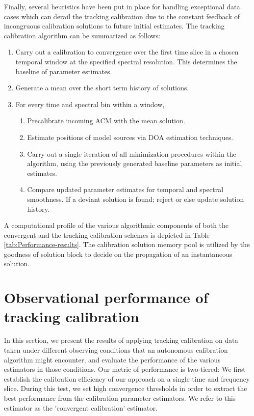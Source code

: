 \documentclass{aa}
\begin{document}
Finally, several heuristics have been put in place for handling exceptional data
cases which can derail the tracking  calibration due to the constant feedback of
incongruous  calibration solutions  to future  initial estimates.   The tracking
calibration algorithm can be summarized as follows:
\begin{enumerate}
\item Carry  out a  calibration to convergence  over the  first time slice  in a
  chosen temporal  window at the specified spectral  resolution. This determines
  the baseline of parameter estimates.
\item Generate a mean over the short term history of solutions.
\item For every time and spectral bin within a window,
  \begin{enumerate}
    \item Precalibrate incoming ACM with the mean solution.
    \item Estimate positions of model sources via DOA estimation techniques.
    \item Carry out a single iteration of all minimization procedures within the
      algorithm, using  the previously generated baseline  parameters as initial
      estimates.
    \item  Compare  updated  parameter   estimates  for  temporal  and  spectral
      smoothness.  If a deviant solution  is found; reject or else update solution
      history.
  \end{enumerate}
\end{enumerate}

A  computational profile  of  the  various algorithmic  components  of both  the
convergent  and   the  tracking  calibration   schemes  is  depicted   in  Table
\ref{tab:Performance-results}.  The calibration solution memory pool is utilized
by  the  goodness  of  solution  block  to  decide  on  the  propagation  of  an
instantaneous solution.

\section{\label{sec:Performance-of-tracking}Observational performance of tracking calibration}


In this section, we present the results of applying tracking calibration on data
taken  under  different  observing  conditions that  an  autonomous  calibration
algorithm  might  encounter,  and   evaluate  the  performance  of  the  various
estimators in  those conditions.   Our metric of  performance is  two-tiered: We
first establish the calibration efficiency of  our approach on a single time and
frequency slice. During  this test, we set high  convergence thresholds in order
to extract the  best performance from the calibration  parameter estimators.  We
refer to this estimator as the 'convergent calibration' estimator.
\end{document}
